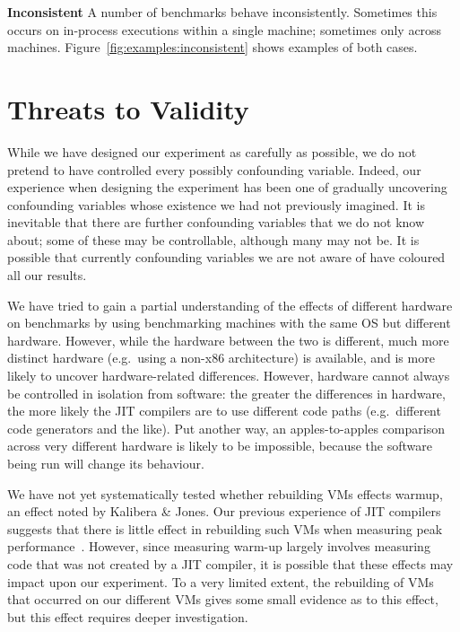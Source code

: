 \documentclass[a4paper,UKenglish]{lipics}
\newcommand{\kalibera}{Kalibera \& Jones\xspace}
\begin{document}
\textbf{Inconsistent} \label{sub:inconsistent}
A number of benchmarks behave inconsistently. Sometimes this occurs on
in-process executions within a single machine; sometimes only across machines.
Figure~\ref{fig:examples:inconsistent} shows examples of both cases.


\section{Threats to Validity}
\label{sec:threats}

While we have designed our experiment as carefully as possible, we do not
pretend to have controlled every possibly confounding variable. Indeed, our
experience when designing the experiment has been one of gradually uncovering
confounding variables whose existence we had not previously imagined. It
is inevitable that there are further confounding variables that we
do not know about; some of these may be controllable, although many may not be.
It is possible that currently confounding variables we are not aware of have
coloured all our results.

We have tried to gain a partial understanding of the effects of different
hardware on benchmarks by using benchmarking machines with the same OS but
different hardware. However, while the hardware between the two is
different, much more distinct hardware (e.g.~using a non-x86 architecture) is
available, and is more likely to uncover hardware-related differences.
However, hardware cannot always be controlled in isolation from software:
the greater the differences in hardware, the more likely the JIT
compilers are to use different code paths (e.g.~different code generators and
the like). Put another way, an apples-to-apples comparison across very different
hardware is likely to be impossible, because the software being run will
change its behaviour.

We have not yet systematically tested whether rebuilding VMs effects warmup, an
effect noted by \kalibera. Our previous experience of JIT compilers suggests
that there is little effect in rebuilding such VMs when measuring peak
performance~\cite{barrett15approaches}. However, since measuring warm-up largely
involves measuring code that was not created by a JIT compiler, it is possible
that these effects may impact upon our experiment. To a very limited extent, the
rebuilding of VMs that occurred on our different VMs gives some small evidence
as to this effect, but this effect requires deeper investigation.
\end{document}

